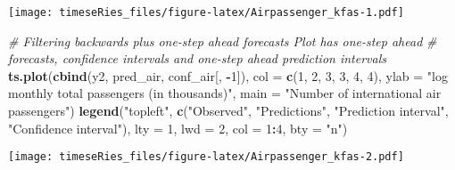 \documentclass[]{book}
\newenvironment{Shaded}{\begin{snugshade}}{\end{snugshade}}
\newcommand{\KeywordTok}[1]{\textcolor[rgb]{0.13,0.29,0.53}{\textbf{#1}}}
\newcommand{\DataTypeTok}[1]{\textcolor[rgb]{0.13,0.29,0.53}{#1}}
\newcommand{\DecValTok}[1]{\textcolor[rgb]{0.00,0.00,0.81}{#1}}
\newcommand{\StringTok}[1]{\textcolor[rgb]{0.31,0.60,0.02}{#1}}
\newcommand{\CommentTok}[1]{\textcolor[rgb]{0.56,0.35,0.01}{\textit{#1}}}
\newcommand{\OperatorTok}[1]{\textcolor[rgb]{0.81,0.36,0.00}{\textbf{#1}}}
\newcommand{\NormalTok}[1]{#1}
\begin{document}
\texttt{[image: timeseRies\_files/figure-latex/Airpassenger\_kfas-1.pdf]}

\begin{Shaded}
\begin{Highlighting}[]
\CommentTok{# Filtering backwards plus one-step ahead forecasts Plot has one-step ahead}
\CommentTok{# forecasts, confidence intervals and one-step ahead prediction intervals}
\KeywordTok{ts.plot}\NormalTok{(}\KeywordTok{cbind}\NormalTok{(y2, pred_air, conf_air[, }\OperatorTok{-}\DecValTok{1}\NormalTok{]), }\DataTypeTok{col =} \KeywordTok{c}\NormalTok{(}\DecValTok{1}\NormalTok{, }\DecValTok{2}\NormalTok{, }\DecValTok{3}\NormalTok{, }\DecValTok{3}\NormalTok{, }\DecValTok{4}\NormalTok{, }\DecValTok{4}\NormalTok{), }\DataTypeTok{ylab =} \StringTok{"log monthly total passengers (in thousands)"}\NormalTok{, }
    \DataTypeTok{main =} \StringTok{"Number of international air passengers"}\NormalTok{)}
\KeywordTok{legend}\NormalTok{(}\StringTok{"topleft"}\NormalTok{, }\KeywordTok{c}\NormalTok{(}\StringTok{"Observed"}\NormalTok{, }\StringTok{"Predictions"}\NormalTok{, }\StringTok{"Prediction interval"}\NormalTok{, }\StringTok{"Confidence interval"}\NormalTok{), }
    \DataTypeTok{lty =} \DecValTok{1}\NormalTok{, }\DataTypeTok{lwd =} \DecValTok{2}\NormalTok{, }\DataTypeTok{col =} \DecValTok{1}\OperatorTok{:}\DecValTok{4}\NormalTok{, }\DataTypeTok{bty =} \StringTok{"n"}\NormalTok{)}
\end{Highlighting}
\end{Shaded}

\texttt{[image: timeseRies\_files/figure-latex/Airpassenger\_kfas-2.pdf]}
\end{document}
